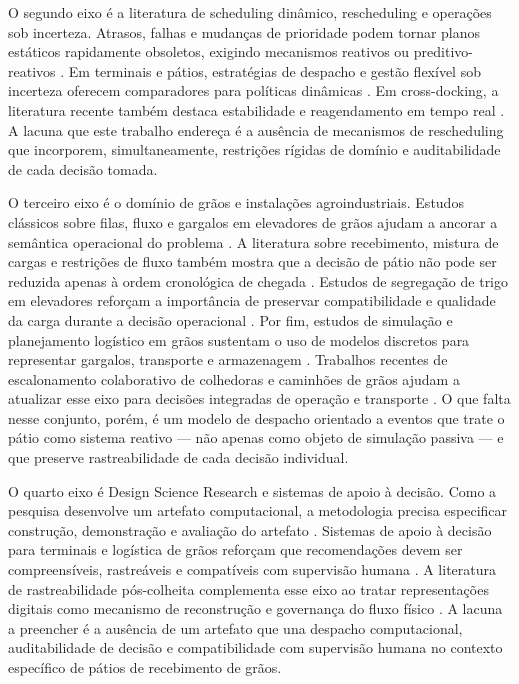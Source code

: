 \documentclass[
  12pt,
  oneside,
  a4paper,
  sumario=tradicional,
  brazil
]{abntex2}
\begin{document}
O segundo eixo \'e a literatura de scheduling din\^amico, rescheduling e opera\c{c}\~oes sob incerteza. Atrasos, falhas e mudan\c{c}as de prioridade podem tornar planos est\'aticos rapidamente obsoletos, exigindo mecanismos reativos ou preditivo-reativos \cite{Li2008,Nasiri2022,Xu2022}. Em terminais e p\'atios, estrat\'egias de despacho e gest\~ao flex\'ivel sob incerteza oferecem comparadores para pol\'iticas din\^amicas \cite{Lange2018,Wang2023,DaSilva2023}. Em cross-docking, a literatura recente tamb\'em destaca estabilidade e reagendamento em tempo real \cite{Torbali2023,Fonseca2025}. A lacuna que este trabalho endere\c{c}a \'e a aus\^encia de mecanismos de rescheduling que incorporem, simultaneamente, restri\c{c}\~oes r\'igidas de dom\'inio e auditabilidade de cada decis\~ao tomada.

O terceiro eixo \'e o dom\'inio de gr\~aos e instala\c{c}\~oes agroindustriais. Estudos cl\'assicos sobre filas, fluxo e gargalos em elevadores de gr\~aos ajudam a ancorar a sem\^antica operacional do problema \cite{Bouland1967,LeBlanc1978,Loewer1990}. A literatura sobre recebimento, mistura de cargas e restri\c{c}\~oes de fluxo tamb\'em mostra que a decis\~ao de p\'atio n\~ao pode ser reduzida apenas \`a ordem cronol\'ogica de chegada \cite{Benock1981,Berruto2001,Ingles2006}. Estudos de segrega\c{c}\~ao de trigo em elevadores refor\c{c}am a import\^ancia de preservar compatibilidade e qualidade da carga durante a decis\~ao operacional \cite{Herrman2002,LeBail2004}. Por fim, estudos de simula\c{c}\~ao e planejamento log\'istico em gr\~aos sustentam o uso de modelos discretos para representar gargalos, transporte e armazenagem \cite{Silva2012,Fioroni2015,Turner2019}. Trabalhos recentes de escalonamento colaborativo de colhedoras e caminh\~oes de gr\~aos ajudam a atualizar esse eixo para decis\~oes integradas de opera\c{c}\~ao e transporte \cite{Wang2025}. O que falta nesse conjunto, por\'em, \'e um modelo de despacho orientado a eventos que trate o p\'atio como sistema reativo --- n\~ao apenas como objeto de simula\c{c}\~ao passiva --- e que preserve rastreabilidade de cada decis\~ao individual.

O quarto eixo \'e Design Science Research e sistemas de apoio \`a decis\~ao. Como a pesquisa desenvolve um artefato computacional, a metodologia precisa especificar constru\c{c}\~ao, demonstra\c{c}\~ao e avalia\c{c}\~ao do artefato \cite{Hevner2004,Peffers2007}. Sistemas de apoio \`a decis\~ao para terminais e log\'istica de gr\~aos refor\c{c}am que recomenda\c{c}\~oes devem ser compreens\'iveis, rastre\'aveis e compat\'iveis com supervis\~ao humana \cite{VanDerHeyden1985,Mardaneh2021,Schmidt2025}. A literatura de rastreabilidade p\'os-colheita complementa esse eixo ao tratar representa\c{c}\~oes digitais como mecanismo de reconstru\c{c}\~ao e governan\c{c}a do fluxo f\'isico \cite{Dyck2023}. A lacuna a preencher \'e a aus\^encia de um artefato que una despacho computacional, auditabilidade de decis\~ao e compatibilidade com supervis\~ao humana no contexto espec\'ifico de p\'atios de recebimento de gr\~aos.
\end{document}
